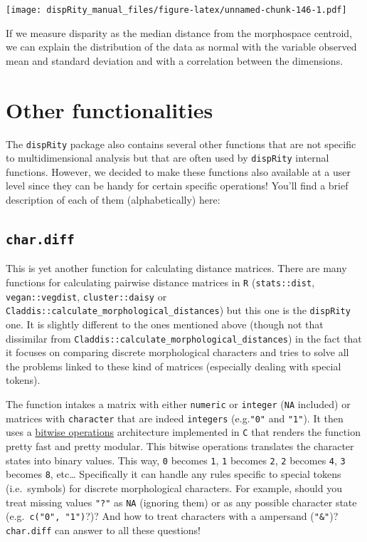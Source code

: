 \documentclass[
]{book}
\begin{document}
\texttt{[image: dispRity\_manual\_files/figure-latex/unnamed-chunk-146-1.pdf]}

If we measure disparity as the median distance from the morphospace centroid, we can explain the distribution of the data as normal with the variable observed mean and standard deviation and with a correlation between the dimensions.

\hypertarget{other-functionalities}{%
\chapter{Other functionalities}\label{other-functionalities}}

The \texttt{dispRity} package also contains several other functions that are not specific to multidimensional analysis but that are often used by \texttt{dispRity} internal functions.
However, we decided to make these functions also available at a user level since they can be handy for certain specific operations!
You'll find a brief description of each of them (alphabetically) here:

\hypertarget{char.diff}{%
\section{\texorpdfstring{\texttt{char.diff}}{char.diff}}\label{char.diff}}

This is yet another function for calculating distance matrices.
There are many functions for calculating pairwise distance matrices in \texttt{R} (\texttt{stats::dist}, \texttt{vegan::vegdist}, \texttt{cluster::daisy} or \texttt{Claddis::calculate\_morphological\_distances}) but this one is the \texttt{dispRity} one.
It is slightly different to the ones mentioned above (though not that dissimilar from \texttt{Claddis::calculate\_morphological\_distances}) in the fact that it focuses on comparing discrete morphological characters and tries to solve all the problems linked to these kind of matrices (especially dealing with special tokens).

The function intakes a matrix with either \texttt{numeric} or \texttt{integer} (\texttt{NA} included) or matrices with \texttt{character} that are indeed \texttt{integers} (e.g.\texttt{"0"} and \texttt{"1"}).
It then uses a \href{https://en.wikipedia.org/wiki/Bitwise_operations_in_C}{bitwise operations} architecture implemented in \texttt{C} that renders the function pretty fast and pretty modular.
This bitwise operations translates the character states into binary values.
This way, \texttt{0} becomes \texttt{1}, \texttt{1} becomes \texttt{2}, \texttt{2} becomes \texttt{4}, \texttt{3} becomes \texttt{8}, etc\ldots{}
Specifically it can handle any rules specific to special tokens (i.e.~symbols) for discrete morphological characters. For example, should you treat missing values \texttt{"?"} as \texttt{NA} (ignoring them) or as any possible character state (e.g.~\texttt{c("0",\ "1")}?)? And how to treat characters with a ampersand (\texttt{"\&"})? \texttt{char.diff} can answer to all these questions!
\end{document}
